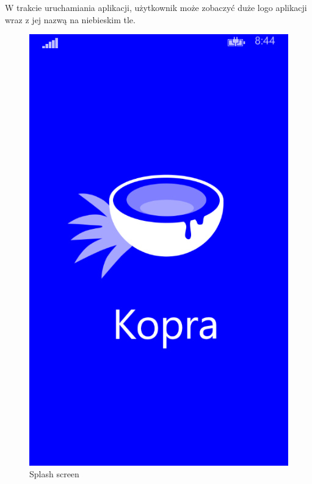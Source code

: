 \documentclass[a4paper,twoside,titlepage,openright]{book}
\begin{document}
W trakcie uruchamiania aplikacji, użytkownik może zobaczyć duże logo aplikacji wraz z jej nazwą na niebieskim tle. 
\begin{figure}[htp]
	\centering
	\begin{minipage}[b]{0.3\textwidth}
		\includegraphics[width=\textwidth]{splashScreen.png}
		\caption{Splash screen}
	\end{minipage}
\hspace*{60px}
	\hfill
\end{figure}
\end{document}
